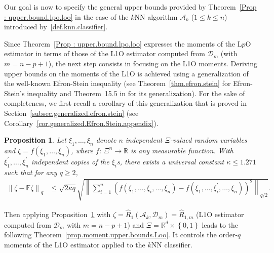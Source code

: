 \documentclass[twoside,11pt]{article}
\numberwithin{equation}{section}
\newtheorem{prop}{Proposition}[section]
\newcommand{\1}{\mathds{1}}%
\newcommand{\paren}[1]{\left( #1 \right)}
\newcommand{\acc}[1]{\left\{ #1 \right\}}
\newcommand{\norm}[1]{\left\| #1 \right\|}
\newcommand{\R}{\mathbb{R}}
\newcommand{\E}{\mathbb{E}}
\newcommand{\Rh}{\widehat{R}}
\newcommand{\D}{\mathcal{D}}
\newcommand{\A}{\mathcal{A}}
\numberwithin{equation}{section}
\theoremstyle{plain}
\begin{document}
Our goal is now to specify the general upper bounds provided by Theorem~\ref{Prop : upper.bound.lpo.loo} in the case of the $k$NN algorithm $\A_k$ ($1\leq k\leq n$) introduced by~\eqref{def.knn.classifier}.

Since Theorem~\ref{Prop : upper.bound.lpo.loo} expresses the moments of the L$p$O estimator in terms of those of the L1O estimator computed from $\D_m$ (with $m=n-p+1$), the next step consists in focusing on the L1O moments.
%
Deriving upper bounds on the moments of the L1O is achieved using a generalization of the well-known Efron-Stein inequality (see Theorem~\ref{thm.efron.stein} for Efron-Stein's inequality and Theorem~15.5 in \cite{BouLugMas_2013} for its generalization).
%
For the sake of completeness, we first recall a corollary of this generalization that is proved in Section~\ref{subsec.generalized.efron.stein} (see Corollary~\ref{cor.generalized.Efron.Stein.appendix}).
%
%
\begin{prop}\label{cor.generalized.Efron.Stein} \sloppy
%
Let $\xi_1,\ldots,\xi_n$ denote $n$ independent  {$\Xi$-valued} random variables and $\zeta=f(\xi_1,\ldots,\xi_n)$, where  {$f:\ \Xi^n\rightarrow \R$ is any measurable function}.
%
With $\xi^\prime_1,\ldots,\xi^\prime_n$ independent copies of the $\xi_i$s, there exists a universal constant $\kappa\leq 1.271$ such that for any $q\geq 2$,
\begin{align*}
	\norm{ \zeta-\E \zeta }_q & \leq \sqrt{2\kappa q} \sqrt{\norm{\sum_{i=1}^n \paren{ f( {\xi_1,\ldots,\xi_i,\ldots,\xi_n})-f(\xi_1,\ldots,\xi^\prime_i,\ldots,\xi_n) }^2}_{q/2}} .
\end{align*}
%
\end{prop}
%
%
Then applying Proposition~\ref{cor.generalized.Efron.Stein} with $ \zeta = \Rh_1(\A_k,\D_m) = \Rh_{1,m}$ (L$1$O estimator computed from $\D_m$ with $m=n-p+1$)  {and $\Xi = \R^d\times \acc{0,1}$} leads to the following Theorem~\ref{prop.moment.upper.bounds.Loo}.
It controls the order-$q$ moments of the L1O estimator applied to the $k$NN classifier.
%
%
\end{document}
